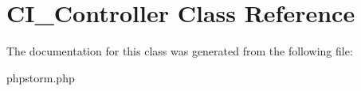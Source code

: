\hypertarget{class_c_i___controller}{}\section{C\+I\+\_\+\+Controller Class Reference}
\label{class_c_i___controller}


The documentation for this class was generated from the following file\+:\begin{DoxyCompactItemize}
\item 
phpstorm.\+php\end{DoxyCompactItemize}

